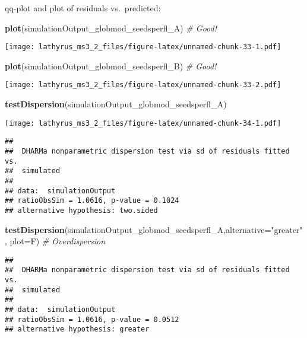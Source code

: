 \documentclass[
]{article}
\newenvironment{Shaded}{\begin{snugshade}}{\end{snugshade}}
\newcommand{\CommentTok}[1]{\textcolor[rgb]{0.56,0.35,0.01}{\textit{#1}}}
\newcommand{\DataTypeTok}[1]{\textcolor[rgb]{0.13,0.29,0.53}{#1}}
\newcommand{\KeywordTok}[1]{\textcolor[rgb]{0.13,0.29,0.53}{\textbf{#1}}}
\newcommand{\NormalTok}[1]{#1}
\newcommand{\StringTok}[1]{\textcolor[rgb]{0.31,0.60,0.02}{#1}}
\begin{document}
qq-plot and plot of residuals vs.~predicted:

\begin{Shaded}
\begin{Highlighting}[]
\KeywordTok{plot}\NormalTok{(simulationOutput_globmod_seedsperfl_A) }\CommentTok{# Good!}
\end{Highlighting}
\end{Shaded}

\texttt{[image: lathyrus\_ms3\_2\_files/figure-latex/unnamed-chunk-33-1.pdf]}

\begin{Shaded}
\begin{Highlighting}[]
\KeywordTok{plot}\NormalTok{(simulationOutput_globmod_seedsperfl_B) }\CommentTok{# Good!}
\end{Highlighting}
\end{Shaded}

\texttt{[image: lathyrus\_ms3\_2\_files/figure-latex/unnamed-chunk-33-2.pdf]}

\begin{Shaded}
\begin{Highlighting}[]
\KeywordTok{testDispersion}\NormalTok{(simulationOutput_globmod_seedsperfl_A)}
\end{Highlighting}
\end{Shaded}

\texttt{[image: lathyrus\_ms3\_2\_files/figure-latex/unnamed-chunk-34-1.pdf]}

\begin{verbatim}
## 
##  DHARMa nonparametric dispersion test via sd of residuals fitted vs.
##  simulated
## 
## data:  simulationOutput
## ratioObsSim = 1.0616, p-value = 0.1024
## alternative hypothesis: two.sided
\end{verbatim}

\begin{Shaded}
\begin{Highlighting}[]
\KeywordTok{testDispersion}\NormalTok{(simulationOutput_globmod_seedsperfl_A,}\DataTypeTok{alternative=}\StringTok{"greater"}\NormalTok{,}
               \DataTypeTok{plot=}\NormalTok{F) }\CommentTok{# Overdispersion}
\end{Highlighting}
\end{Shaded}

\begin{verbatim}
## 
##  DHARMa nonparametric dispersion test via sd of residuals fitted vs.
##  simulated
## 
## data:  simulationOutput
## ratioObsSim = 1.0616, p-value = 0.0512
## alternative hypothesis: greater
\end{verbatim}
\end{document}
